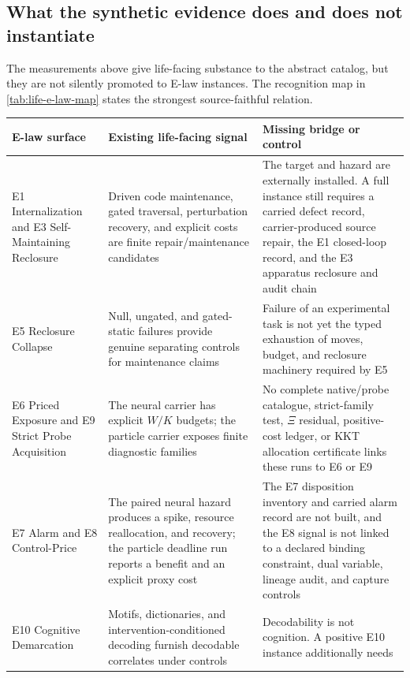 \subsection{What the synthetic evidence does and does not instantiate}

The measurements above give life-facing substance to the abstract catalog,
but they are not silently promoted to E-law instances.  The recognition map
in \cref{tab:life-e-law-map} states the strongest source-faithful relation.

\begin{table}[htbp]
\centering
\scriptsize
\begin{tabularx}{\textwidth}{@{}lXX@{}}
\toprule
E-law surface & Existing life-facing signal & Missing bridge or control \\
\midrule
E1 Internalization and E3 Self-Maintaining Reclosure &
Driven code maintenance, gated traversal, perturbation recovery, and explicit
costs are finite repair/maintenance candidates &
The target and hazard are externally installed.  A full instance still
requires a carried defect record, carrier-produced source repair, the E1
closed-loop record, and the E3 apparatus reclosure and audit
chain \\
E5 Reclosure Collapse &
Null, ungated, and gated-static failures provide genuine separating controls
for maintenance claims &
Failure of an experimental task is not yet the typed exhaustion of moves,
budget, and reclosure machinery required by E5 \\
E6 Priced Exposure and E9 Strict Probe Acquisition &
The neural carrier has explicit $W/K$ budgets; the particle carrier exposes
finite diagnostic families &
No complete native/probe catalogue, strict-family test, $\Xi$ residual,
positive-cost ledger, or KKT allocation certificate links these runs to E6
or E9 \\
E7 Alarm and E8 Control-Price &
The paired neural hazard produces a spike, resource reallocation, and
recovery; the particle deadline run reports a benefit and an explicit proxy
cost &
The E7 disposition inventory and carried alarm record are not built, and the
E8 signal is not linked to a declared binding constraint, dual variable,
lineage audit, and capture controls \\
E10 Cognitive Demarcation &
Motifs, dictionaries, and intervention-conditioned decoding furnish
decodable correlates under controls &
Decodability is not cognition.  A positive E10 instance additionally needs

\end{tabularx}
\end{table}
